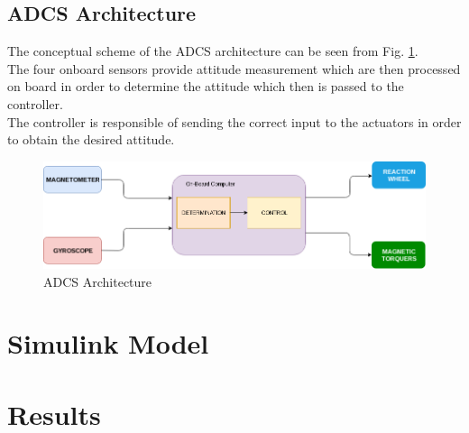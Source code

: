 \documentclass[11pt,a4paper]{report}
\begin{document}
\newpage

\section{ADCS Architecture}
The conceptual scheme of the ADCS architecture can be seen from Fig. \ref{fig:architecture}.\\
The four onboard sensors provide attitude measurement which are then processed on board in order to determine the attitude which then is passed to the controller.\\
The controller is responsible of sending the correct input to the actuators in order to obtain the desired attitude.

\begin{figure}[H]
 	\centering
 	\includegraphics[scale=0.5]{gfx/adcs.png}
    \caption{ADCS Architecture}
    \label{fig:architecture}
\end{figure}


\chapter{Simulink Model}

\chapter{Results}

\newpage
\end{document}
